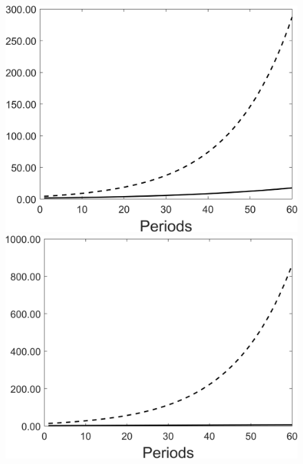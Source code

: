 \begin{figure}[h!!]
\begin{minipage}[]{0.32\textwidth}
	\end{minipage}
	\begin{minipage}[]{0.32\textwidth}
		\includegraphics[width=1\textwidth]{../codding_model/Own/figures/Rep_agent/staticRam_LF_separate_yd_periods59_eppsilon0.40_zeta1.40_Ad08_Ac04_thetac0.70_thetad0.56_HetGrowth1_tauul0.181_util0_withtarget0_lgd0.png}
	\end{minipage}
	\begin{minipage}[]{0.32\textwidth}
		\includegraphics[width=1\textwidth]{../codding_model/Own/figures/Rep_agent/staticRam_LF_separate_xd_periods59_eppsilon0.40_zeta1.40_Ad08_Ac04_thetac0.70_thetad0.56_HetGrowth1_tauul0.181_util0_withtarget0_lgd0.png}

\end{minipage}
\end{figure}
